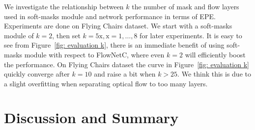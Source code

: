 \documentclass[10pt,twocolumn,letterpaper]{article}
\begin{document}
We investigate the relationship between $k$ the number of mask and flow layers used in soft-masks module and network performance in terms of EPE. Experiments are done on Flying Chairs dataset. We start with a soft-masks module of $k=2$, then set $k=5\mathrm{x}, \mathrm{x}=1, \dots, 8$ for later experiments. It is easy to see from Figure~\ref{fig: evaluation k}, there is an immediate benefit of using soft-masks module with respect to FlowNetC, where even $k=2$ will efficiently boost the performance. On Flying Chairs dataset the curve in Figure~\ref{fig: evaluation k} quickly converge after $k=10$ and raise a bit when $k>25$. We think this is due to a slight overfitting when separating optical flow to too many layers. 



\section{Discussion and Summary}

{\small


}
\end{document}
